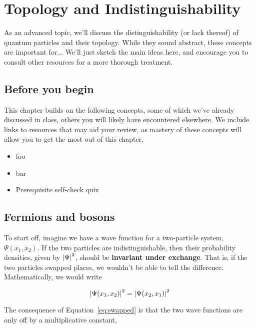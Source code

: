 \documentclass[12pt, english]{book}
\begin{document}
\chapter[Topology]{Topology and Indistinguishability} \label{ch:topo}
As an advanced topic, we'll discuss the distinguishability (or lack thereof) of quantum particles and their topology.
While they sound abstract, these concepts are important for...
We'll just sketch the main ideas here, and encourage you to consult other resources for a more thorough treatment.



\section{Before you begin}

This chapter builds on the following concepts, some of which we've already discussed in class, others you will likely have encountered elsewhere.
We include links to resources that may aid your review, as mastery of these concepts will allow you to get the most out of this chapter.

\begin{itemize}
	\item foo 
	\item bar 
	\item Prerequisite self-check quiz 
\end{itemize}



\section{Fermions and bosons}

To start off, imagine we have a wave function for a two-particle system, $\Psi(x_1, x_2)$.
If the two particles are indistinguishable, then their probability densities, given by $\abs{\Psi}^2$, should be \textbf{invariant under exchange}.
That is, if the two particles swapped places, we wouldn't be able to tell the difference.
Mathematically, we would write

\begin{equation}
	\abs{\Psi(x_1, x_2)}^2 = \abs{\Psi(x_2, x_1)}^2  \label{eq:swapped}
\end{equation}

The consequence of Equation~\ref{eq:swapped} is that the two wave functions are only off by a multiplicative constant,
\end{document}
